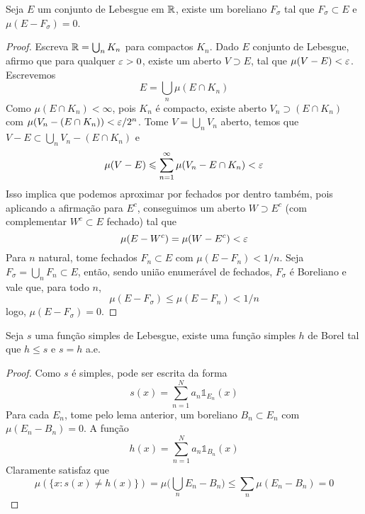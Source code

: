 \begin{lemma}
    \label{lemm:borel_approx}
    Seja $E$ um conjunto de Lebesgue em $\mathbb{R}$, existe um boreliano $F_\sigma$
    tal que $F_\sigma \subset E$ e $\mu(E - F_\sigma) = 0$.
\end{lemma}
\begin{proof}
    Escreva $\mathbb{R} = \bigcup_n K_n$ para compactos $K_n$. Dado $E$ conjunto de Lebesgue, afirmo que para 
    qualquer $\varepsilon > 0$, existe um aberto $V \supset E$, tal que $\mu(V - E) < \varepsilon$. Escrevemos 
    $$E = \bigcup_n \mu(E \cap K_n)$$
    Como $\mu(E \cap K_n) < \infty$, pois $K_n$ é compacto, existe aberto $V_n \supset (E \cap K_n)$ com $\mu(V_n - (E \cap K_n)) < \varepsilon/2^n$.
    Tome $V = \bigcup_n V_n$ aberto, temos que $V - E \subset \bigcup_n V_n - (E \cap K_n)$ e
    $$\mu(V - E) \leqslant \sum_{n=1}^{\infty} \mu(V_n - E \cap K_n) < \varepsilon$$
    Isso implica que podemos aproximar por fechados por dentro também, pois aplicando a afirmação 
    para $E^c$, conseguimos um aberto $W \supset E^c$ (com complementar $W^c \subset E$ fechado) tal que
    $$\mu(E - W^c) = \mu(W - E^c) < \varepsilon$$
    Para $n$ natural, tome fechados $F_n \subset E$ com $\mu(E - F_n) < 1/n$. Seja $F_\sigma = \bigcup_n F_n \subset E$,
    então, sendo união enumerável de fechados, $F_\sigma$ é Boreliano e vale que, para todo $n$,
    $$\mu(E - F_\sigma) \leq \mu(E - F_n) < 1/n$$
    logo, $\mu(E - F_\sigma) = 0$.
    
\end{proof}
\begin{lemma}
    Seja $s$ uma função simples de Lebesgue, existe uma função simples $h$ de Borel tal que $h \leq s$ e
    $s = h$ a.e.
\end{lemma}
\begin{proof}
    Como $s$ é simples, pode ser escrita da forma
    $$s(x) = \sum_{n = 1}^{N} a_n \mathds{1}_{E_n}(x)$$
    Para cada $E_n$, tome pelo lema anterior, um boreliano $B_n \subset E_n$ com $\mu(E_n - B_n) = 0$. A função
    $$h(x) = \sum_{n=1}^{N} a_n \mathds{1}_{B_n}(x)$$
    Claramente satisfaz que 
    $$\mu(\{x : s(x) \neq h(x)\}) = \mu\bigg(\bigcup_n E_n - B_n \bigg) \leq \sum_{n} \mu(E_n - B_n) = 0$$
\end{proof}

